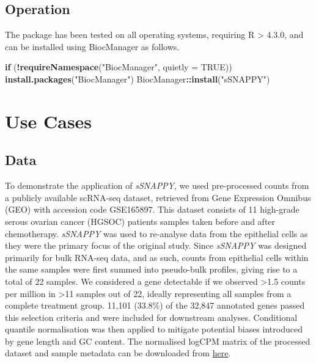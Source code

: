 \documentclass[9pt,a4paper,]{extarticle}
\newenvironment{Shaded}{\begin{snugshade}}{\end{snugshade}}
\newcommand{\AttributeTok}[1]{\textcolor[rgb]{0.13,0.29,0.53}{#1}}
\newcommand{\ConstantTok}[1]{\textcolor[rgb]{0.56,0.35,0.01}{#1}}
\newcommand{\ControlFlowTok}[1]{\textcolor[rgb]{0.13,0.29,0.53}{\textbf{#1}}}
\newcommand{\FunctionTok}[1]{\textcolor[rgb]{0.13,0.29,0.53}{\textbf{#1}}}
\newcommand{\NormalTok}[1]{#1}
\newcommand{\SpecialCharTok}[1]{\textcolor[rgb]{0.81,0.36,0.00}{\textbf{#1}}}
\newcommand{\StringTok}[1]{\textcolor[rgb]{0.31,0.60,0.02}{#1}}
\begin{document}
\hypertarget{operation}{%
\subsection{Operation}\label{operation}}

The package has been tested on all operating systems, requiring R \textgreater{} 4.3.0, and can be installed using BiocManager as follows.

\begin{Shaded}
\begin{Highlighting}[]
\ControlFlowTok{if}\NormalTok{ (}\SpecialCharTok{!}\FunctionTok{requireNamespace}\NormalTok{(}\StringTok{"BiocManager"}\NormalTok{, }\AttributeTok{quietly =} \ConstantTok{TRUE}\NormalTok{))}
  \FunctionTok{install.packages}\NormalTok{(}\StringTok{"BiocManager"}\NormalTok{)}
\NormalTok{BiocManager}\SpecialCharTok{::}\FunctionTok{install}\NormalTok{(}\StringTok{"sSNAPPY"}\NormalTok{)}
\end{Highlighting}
\end{Shaded}

\hypertarget{use-cases}{%
\section{Use Cases}\label{use-cases}}

\hypertarget{data}{%
\subsection{Data}\label{data}}

To demonstrate the application of \emph{sSNAPPY}, we used pre-processed counts from a publicly available scRNA-seq dataset, retrieved from Gene Expression Omnibus (GEO) with accession code GSE165897.
This dataset consists of 11 high-grade serous ovarian cancer (HGSOC) patients samples taken before and after chemotherapy\citep{Zhang2022}.
\emph{sSNAPPY} was used to re-analyse data from the epithelial cells as they were the primary focus of the original study.
Since \emph{sSNAPPY} was designed primarily for bulk RNA-seq data, and as such, counts from epithelial cells within the same samples were first summed into pseudo-bulk profiles, giving rise to a total of 22 samples.
We considered a gene detectable if we observed \textgreater1.5 counts per million in \textgreater11 samples out of 22, ideally representing all samples from a complete treatment group.
11,101 (33.8\%) of the 32,847 annotated genes passed this selection criteria and were included for downstream analyses.
Conditional quantile normalisation\citep{Hansen2012} was then applied to mitigate potential biases introduced by gene length and GC content.
The normalised logCPM matrix of the processed dataset and sample metadata can be downloaded from \href{https://github.com/Wenjun-Liu/F1000_sSNAPPY_manuscript/tree/master/data}{here}.
\end{document}
